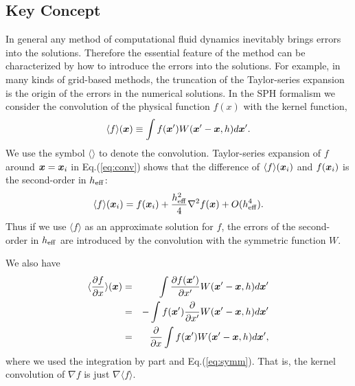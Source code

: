 \documentclass{cjour}
\newcommand{ \Vec   }[1]{ \mbox{\boldmath $ #1 $} }
\newcommand{ \PD    }[2]{ \frac{ \partial #1 }{ \partial #2 } }
\begin{document}
\begin{article}
\subsection{Key Concept}
                                                       \label{Sec:Pre}
In general any method of computational fluid dynamics 
inevitably brings errors into the solutions.   
Therefore the essential feature of the method can be characterized 
by how to introduce the errors into the solutions.  
For example, in many kinds of grid-based methods,  
the truncation of the Taylor-series expansion is the origin 
of the errors in the numerical solutions.   
In the SPH formalism 
we consider the convolution of 
the physical function $f(x)$ with the kernel function,   
\begin{equation}
             \langle f \rangle (\Vec{x}) \equiv  
             \int f(\Vec{x}') W(\Vec{x}'-\Vec{x},h) d\Vec{x}' . 
                                                     \label{eq:conv}
\end{equation}
We use the symbol $\langle \rangle$ to denote the convolution. 
Taylor-series expansion of $f$ around $\Vec{x}=\Vec{x}_i$ 
in Eq.(\ref{eq:conv}) shows that the difference of 
$\langle f \rangle (\Vec{x}_i)$ and $f(\Vec{x}_i)$ is 
the second-order in $h_{\rm eff}$:    
\begin{equation}
             \langle f \rangle (\Vec{x}_i) = 
                f(\Vec{x}_i) 
             + \frac{h_{\rm eff}^2}{4} \nabla^2 f(\Vec{x}) 
             + O(h_{\rm eff}^4) .
                                                  \label{eq:ConvError}
\end{equation}
Thus if we use $\langle f \rangle$ 
as an approximate solution for $f$, 
the errors of the second-order in $h_{\rm eff}$ are introduced 
by the convolution with the symmetric function $W$. 

We also have 
\begin{eqnarray}
             \langle \PD{f}{x} \rangle (\Vec{x}) & = &
      \int \PD{f(\Vec{x}')}{x'}   W(\Vec{x}'-\Vec{x},h) d\Vec{x}'
                                                          \nonumber \\ 
    & = & - \int f(\Vec{x}') \PD{}{x'} 
                 W(\Vec{x}'-\Vec{x},h) d\Vec{x}'
                                                          \nonumber \\ 
    & = &   \PD{}{x} \int f(\Vec{x}')  
                 W(\Vec{x}'-\Vec{x},h) d\Vec{x}', 
                                                     \label{eq:gconvn}
\end{eqnarray}
where we used the integration by part and Eq.(\ref{eq:symm}). 
That is, the kernel convolution of $\nabla f$ is just 
$\nabla \langle f \rangle $. 


\end{article}
\end{document}
